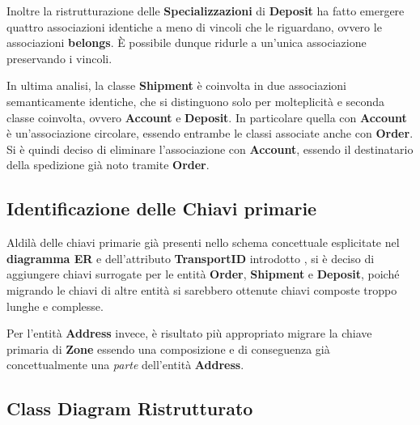 Inoltre la ristrutturazione delle \textbf{Specializzazioni} di \textbf{Deposit} ha fatto emergere quattro associazioni identiche a meno di vincoli che le riguardano, ovvero le associazioni \textbf{belongs}. È possibile dunque ridurle a un'unica associazione preservando i vincoli.

In ultima analisi, la classe \textbf{Shipment} è coinvolta in due associazioni semanticamente identiche, che si distinguono solo per molteplicità e seconda classe coinvolta, ovvero \textbf{Account} e \textbf{Deposit}. In particolare quella con \textbf{Account} è un'associazione circolare, essendo entrambe le classi associate anche con \textbf{Order}. Si è quindi deciso di eliminare l'associazione con \textbf{Account}, essendo il destinatario della spedizione già noto tramite \textbf{Order}.

\subsection{Identificazione delle Chiavi primarie}

Aldilà delle chiavi primarie già presenti nello schema concettuale esplicitate nel \textbf{diagramma ER} e dell'attributo \textbf{TransportID} introdotto , si è deciso di aggiungere chiavi surrogate per le entità \textbf{Order}, \textbf{Shipment} e \textbf{Deposit}, poiché migrando le chiavi di altre entità si sarebbero ottenute chiavi composte troppo lunghe e complesse.

Per l'entità \textbf{Address} invece, è risultato più appropriato migrare la chiave primaria di \textbf{Zone} essendo una composizione e di conseguenza già concettualmente una \textit{parte} dell'entità \textbf{Address}. 

\newpage

\subsection{Class Diagram Ristrutturato}



\newpage


